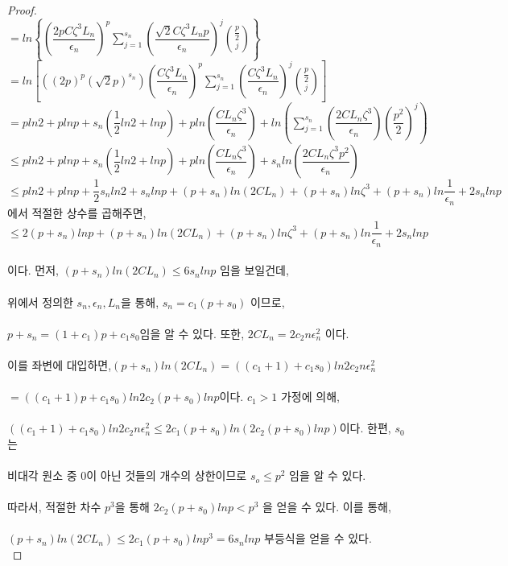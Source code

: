 \begin{proof}
\\
$=ln\left\{\left(\dfrac{2pC\zeta^3L_n}{\epsilon_n}\right)^p \displaystyle \sum\limits_{j=1}^{s_n}\left(\dfrac{\sqrt{2}C\zeta^3L_np}{\epsilon_n}\right)^j{\dfrac{p}{2} \choose j}\right\}$\\
$= ln\left[((2p)^p(\sqrt{2}p)^{s_n})\left(\dfrac{C\zeta^3L_n}{\epsilon_n}\right)^p \displaystyle \sum\limits_{j=1}^{s_n} \left(\dfrac{C\zeta^3L_n}{\epsilon_n}\right)^j{\dfrac{p}{2} \choose j}\right]$\\
$=pln2+plnp+s_n(\dfrac{1}{2}ln2+lnp)+pln\left(\dfrac{CL_n\zeta^3}{\epsilon_n}\right)+ln\left( \displaystyle \sum\limits_{j=1}^{s_{n}}\left(\dfrac{2CL_n\zeta^3}{\epsilon_n}\right)(\dfrac{p^2}{2})^j\right)$\\
$\leq pln2+plnp+s_n(\dfrac{1}{2}ln2+lnp)+pln\left(\dfrac{CL_n\zeta^3}{\epsilon_n}\right)+s_{n}ln\left(\dfrac{2CL_n\zeta^3p^2}{\epsilon_n}\right)$\\
$\leq pln2+plnp+\dfrac{1}{2}s_nln2+s_nlnp+(p+s_n)ln(2CL_n)+(p+s_n)ln\zeta^3+(p+s_n)ln\dfrac{1}{\epsilon_n}+2s_nlnp $ 에서 적절한 상수를 곱해주면,\\
$\leq 2(p+s_n)lnp+(p+s_n)ln(2CL_n)+(p+s_n)ln\zeta^3+(p+s_n)ln\dfrac{1}{\epsilon_n}+2s_nlnp $\\
\\
이다. 먼저, $(p+s_n)ln(2CL_n)\leq 6s_nlnp$ 임을 보일건데,\\
\\
위에서 정의한 $s_n,\epsilon_n,L_n$을 통해, $s_n=c_1(p+s_0)$ 이므로,\\
\\
$p+s_n=(1+c_1)p+c_1s_0$임을 알 수 있다. 또한, $2CL_n=2c_2n\epsilon_n^2$ 이다.\\
\\
이를 좌변에 대입하면,$(p+s_n)ln(2CL_n)=((c_1+1)+c_1s_0)ln2c_2n\epsilon_n^2$\\
\\
$=((c_1+1)p+c_1s_0)ln2c_2(p+s_0)lnp$이다. $c_1 > 1$ 가정에 의해,\\
\\
$((c_1+1)+c_1s_0)ln2c_2n\epsilon_n^2\leq 2c_1(p+s_0)ln(2c_2(p+s_0)lnp)$이다. 한편, $s_0$는\\
\\
비대각 원소 중 0이 아닌 것들의 개수의 상한이므로 $s_o\leq p^2$ 임을 알 수 있다. \\
\\
따라서, 적절한 차수 $p^3$을 통해 $2c_2(p+s_0)lnp<p^3$ 을 얻을 수 있다. 이를 통해,\\
\\
$(p+s_n)ln(2CL_n)\leq 2c_1(p+s_0)lnp^3=6s_nlnp$ 부등식을 얻을 수 있다.\\

\end{proof}

